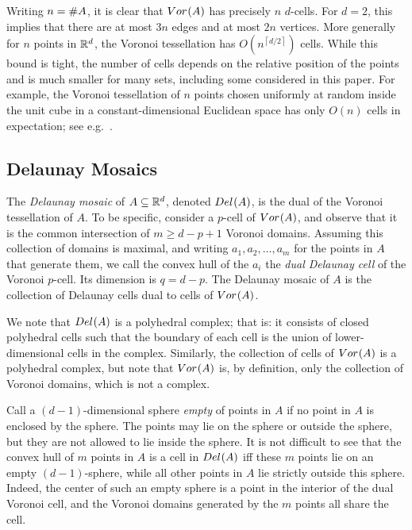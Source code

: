 \documentclass[a4paper]{article}
\newcommand {\mm}[1]   {\ifmmode{#1}\else{\mbox{\(#1\)}}\fi}
\newcommand {\ceiling}[1] {{\left\lceil #1 \right\rceil}}
\newcommand{\Rspace}        {\mm{{\mathbb R}}}
\newcommand{\Voronoi}[2]    {\mm{{\rm Vor}_{#1}{({#2})}}}
\newcommand{\Delaunay}[2]   {\mm{{\rm Del}_{#1}{({#2})}}}
\newcommand{\card}[1]       {\mm{{\#}{#1}}}
\theoremstyle{definition}
\numberwithin{theorem}{section}
\numberwithin{equation}{section}
\begin{document}
\medskip
Writing $n = \card{A}$, it is clear that $\Voronoi{}{A}$ has precisely $n$ $d$-cells.
For $d = 2$, this implies that there are at most $3n$ edges and at most $2n$ vertices.
More generally for $n$ points in $\Rspace^d$, the Voronoi tessellation has $O (n^{\ceiling{d/2}})$ cells.
While this bound is tight, the number of cells depends on the relative position of the points and is much smaller for many sets, including some considered in this paper.
For example, the Voronoi tessellation of $n$ points chosen uniformly at random inside the unit cube in a constant-dimensional Euclidean space has only $O (n)$ cells in expectation; see e.g.\ \cite{Dwy91}.


\subsection{Delaunay Mosaics}
\label{sec:2.2}

The \emph{Delaunay mosaic} of $A \subseteq \Rspace^d$, denoted $\Delaunay{}{A}$, is the dual of the Voronoi tessellation of $A$.
To be specific, consider a $p$-cell of $\Voronoi{}{A}$, and observe that it is the common intersection of $m \geq d-p+1$ Voronoi domains.
Assuming this collection of domains is maximal, and writing $a_1, a_2, \ldots, a_m$ for the points in $A$ that generate them, we call the convex hull of the $a_i$ the \emph{dual Delaunay cell} of the Voronoi $p$-cell.
Its dimension is $q = d-p$.
The Delaunay mosaic of $A$ is the collection of Delaunay cells dual to cells of $\Voronoi{}{A}$.

We note that $\Delaunay{}{A}$ is a polyhedral complex; that is: it consists of closed polyhedral cells such that the boundary of each cell is the union of lower-dimensional cells in the complex.
Similarly, the collection of cells of $\Voronoi{}{A}$ is a polyhedral complex, but note that $\Voronoi{}{A}$ is, by definition, only the collection of Voronoi domains, which is not a complex.

\medskip
Call a $(d-1)$-dimensional sphere \emph{empty} of points in $A$ if no point in $A$ is enclosed by the sphere.
The points may lie on the sphere or outside the sphere, but they are not allowed to lie inside the sphere.
It is not difficult to see that the convex hull of $m$ points in $A$ is a cell in $\Delaunay{}{A}$ iff these $m$ points lie on an empty $(d-1)$-sphere, while all other points in $A$ lie strictly outside this sphere.
Indeed, the center of such an empty sphere is a point in the interior of the dual Voronoi cell, and the Voronoi domains generated by the $m$ points all share the cell.
\end{document}
